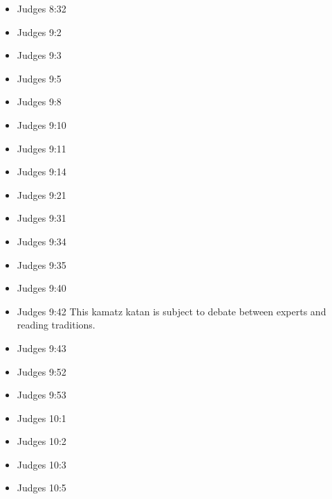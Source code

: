 \documentclass[14pt]{article}
\begin{document}
\begin{multicols}{2}
\begin{itemize}
			\item Judges 8:32
			
			\item Judges 9:2
			
			\item Judges 9:3
			
			\item Judges 9:5
			
			\item Judges 9:8
			
			\item Judges 9:10
			
			\item Judges 9:11
			
			\item Judges 9:14
			
			\item Judges 9:21
			
			\item Judges 9:31
			
			\item Judges 9:34
			
			\item Judges 9:35
			
			\item Judges 9:40
			
			\item Judges 9:42 This kamatz katan is subject to debate between experts and reading traditions.
			
			\item Judges 9:43
			
			\item Judges 9:52
			
			\item Judges 9:53
			
			\item Judges 10:1
			
			\item Judges 10:2
			
			\item Judges 10:3
			
			\item Judges 10:5
			

\end{itemize}
\end{multicols}
\end{document}
